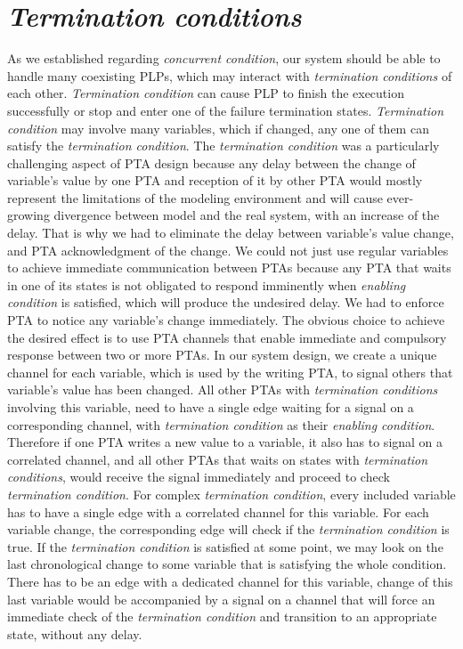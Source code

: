 \section{\textit{Termination conditions} \label{plp_to_pta_termination_conditions}}
As we established regarding \textit{concurrent condition}, our system should be able to handle many coexisting PLPs, which may interact with \textit{termination conditions} of each other. \textit{Termination condition} can cause PLP to finish the execution successfully or stop and enter one of the failure termination states. \textit{Termination condition} may involve many variables, which if changed, any one of them can satisfy the \textit{termination condition}. The \textit{termination condition} was a particularly challenging aspect of PTA design because any delay between the change of variable’s value by one PTA and reception of it by other PTA would mostly represent the limitations of the modeling environment and will cause ever-growing divergence between model and the real system, with an increase of the delay. That is why we had to eliminate the delay between variable’s value change, and PTA acknowledgment of the change. We could not just use regular variables to achieve immediate communication between PTAs because any PTA that waits in one of its states is not obligated to respond imminently when \textit{enabling condition} is satisfied, which will produce the undesired delay. We had to enforce PTA to notice any variable’s change immediately. The obvious choice to achieve the desired effect is to use PTA channels that enable immediate and compulsory response between two or more PTAs. In our system design, we create a unique channel for each variable, which is used by the writing PTA, to signal others that variable's value has been changed. All other PTAs with \textit{termination conditions} involving this variable, need to have a single edge waiting for a signal on a corresponding channel, with \textit{termination condition} as their \textit{enabling condition}. Therefore if one PTA writes a new value to a variable, it also has to signal on a correlated channel, and all other PTAs that waits on states with \textit{termination conditions}, would receive the signal immediately and proceed to check \textit{termination condition}. For complex \textit{termination condition}, every included variable has to have a single edge with a correlated channel for this variable. For each variable change, the corresponding edge will check if the \textit{termination condition} is true. If the \textit{termination condition} is satisfied at some point, we may look on the last chronological change to some variable that is satisfying the whole condition. There has to be an edge with a dedicated channel for this variable, change of this last variable would be accompanied by a signal on a channel that will force an immediate check of the \textit{termination condition} and transition to an appropriate state, without any delay.  
